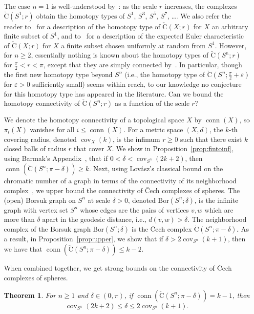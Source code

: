 \documentclass[11 pt,a4paper,twoside,reqno]{amsart}
\newtheorem{theorem}{Theorem}[section]
\theoremstyle{definition}
\newcommand{\cech}[2]{\mathrm{\check{C}}(#1;#2)}
\DeclareMathOperator{\conn}{conn}
\DeclareMathOperator{\cov}{cov}
\newcommand{\bor}[2]{\mathrm{Bor}(#1;#2)}
\begin{document}
The case $n=1$ is well-understood by~\cite[Section~9]{AA-VRS1}: as the scale $r$ increases, the complexes $\cech{S^1}{r}$ obtain the homotopy types of $S^1$, $S^3$, $S^5$, $S^7$, \ldots.
We also refer the reader to~\cite{AAFPP-J} for a description of the homotopy type of $\cech{X}{r}$ for $X$ an arbitrary finite subset of $S^1$, and to~\cite{lim2026strange} for a description of the expected Euler characteristic of $\cech{X}{r}$ for $X$ a finite subset chosen uniformly at random from $S^1$.
However, for $n\ge 2$, essentially nothing is known about the homotopy types of $\cech{S^n}{r}$ for $\frac{\pi}{2}<r<\pi$, except that they are simply connected by~\cite[Theorem 11.2]{virk20201}.
In particular, though the first new homotopy type beyond $S^n$ (i.e., the homotopy type of $\cech{S^n}{\frac{\pi}{2}+\varepsilon}$ for $\varepsilon>0$ sufficiently small) seems within reach, to our knowledge no conjecture for this homotopy type has appeared in the literature.
Can we bound the homotopy connectivity of $\cech{S^n}{r}$ as a function of the scale $r$?

We denote the homotopy connectivity of a topological space $X$ by $\conn(X)$, so $\pi_i(X)$ vanishes for all $i\le \conn(X)$.
For a metric space $(X,d)$, the $k$-th covering radius, denoted $\cov_X(k)$, is the infimum $r\ge 0$ such that there exist $k$ closed balls of radius $r$ that cover $X$.
We show in Proposition~\ref{prop:fintoinf}, using Barmak's Appendix~\cite{farber2023large}, that if $0<\delta<\cov_{S^n}(2k+2)$, then $\conn(\cech{S^n}{\pi-\delta}) \ge k$.
Next, using Lov{\'a}sz's classical bound on the chromatic number of a graph in terms of the connectivity of its neighborhood complex~\cite{Lovasz1978}, we upper bound the connectivity of \v{C}ech complexes of spheres.
The (open) Borsuk graph on $S^n$ at scale $\delta>0$, denoted $\bor{S^n}{\delta}$, is the infinite graph with vertex set $S^n$ whose edges are the pairs of vertices $v,w$ which are more than $\delta$ apart in the geodesic distance, i.e., $d(v,w)>\delta$.
The neighborhood complex of the Borsuk graph $\bor{S^n}{\delta}$ is the \v{C}ech complex $\cech{S^n}{\pi-\delta}$.
As a result, in Proposition~\ref{prop:upper}, we show that if $\delta> 2\cov_{S^n}(k+1)$, then we have that $\conn(\cech{S^n}{\pi-\delta})\leq k-2$.

When combined together, we get strong bounds on the connectivity of \v{C}ech complexes of spheres.

\begin{theorem}
\label{thm:main}
For $n\ge 1$ and $\delta\in(0,\pi)$, if $\conn(\cech{S^n}{\pi-\delta})=k-1$, then
\[\cov_{S^n}(2k+2)\le \delta\le 2\cov_{S^n}(k+1).\]
\end{theorem}
\end{document}
